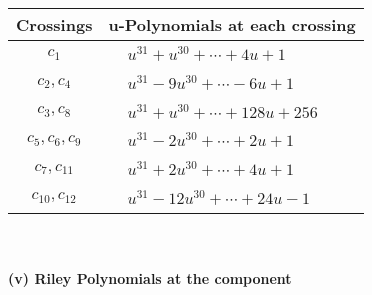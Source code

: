 \documentclass[1p]{elsarticle_modified}
\theoremstyle{definition}
\begin{document}
\begin{tabular}{m{50pt}|m{274pt}}
Crossings & \hspace{64pt}u-Polynomials at each crossing \\
\hline $$\begin{aligned}c_{1}\end{aligned}$$&$\begin{aligned}
&u^{31}+u^{30}+\cdots+4 u+1
\end{aligned}$\\
\hline $$\begin{aligned}c_{2},c_{4}\end{aligned}$$&$\begin{aligned}
&u^{31}-9 u^{30}+\cdots-6 u+1
\end{aligned}$\\
\hline $$\begin{aligned}c_{3},c_{8}\end{aligned}$$&$\begin{aligned}
&u^{31}+u^{30}+\cdots+128 u+256
\end{aligned}$\\
\hline $$\begin{aligned}c_{5},c_{6},c_{9}\end{aligned}$$&$\begin{aligned}
&u^{31}-2 u^{30}+\cdots+2 u+1
\end{aligned}$\\
\hline $$\begin{aligned}c_{7},c_{11}\end{aligned}$$&$\begin{aligned}
&u^{31}+2 u^{30}+\cdots+4 u+1
\end{aligned}$\\
\hline $$\begin{aligned}c_{10},c_{12}\end{aligned}$$&$\begin{aligned}
&u^{31}-12 u^{30}+\cdots+24 u-1
\end{aligned}$\\
\hline
\end{tabular}\\~\\
\newpage\renewcommand{\arraystretch}{1}
\flushleft \textbf{(v) Riley Polynomials at the component}\newline \\
\end{document}
